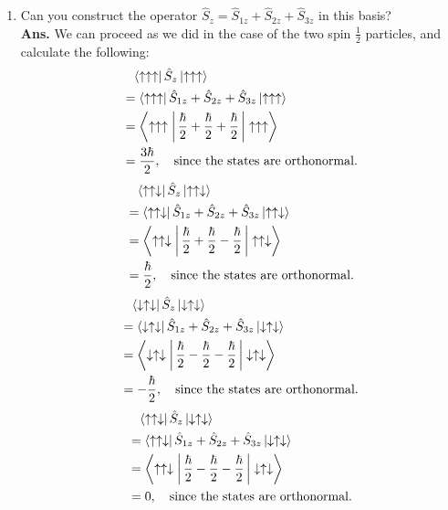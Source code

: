 \documentclass[12pt]{article}
\newcommand\half{\frac{1}{2}}
\newcommand\lr{\left \langle}
\newcommand\rr{\right \rangle}
\newcommand\ls{\left |}
\newcommand\rs{\right |}
\newcommand\hs{\hat{S}}
\newcommand\ua{\uparrow}
\newcommand\da{\downarrow}
\newcommand\hhalf{\frac{\hbar}{2}}
\begin{document}
\begin{enumerate}[1.]
\item Can you construct the operator $\hs_{z}=\hs_{1z}+\hs_{2z}+\hs_{3z}$ in this basis? \\ \newline
\textbf{Ans.} We can proceed as we did in the case of the two spin $\half$ particles, and calculate the following:
$$
\begin{aligned}
       & \hphantom{=} \lr \ua \ua \ua \rs \hs_{z} \ls \ua \ua \ua \rr \\
       & = \lr \ua \ua \ua \rs \hs_{1z}+\hs_{2z}+\hs_{3z} \ls \ua \ua \ua \rr \\
       & = \lr \ua \ua \ua \vphantom{\hhalf} \rs \hhalf + \hhalf + \hhalf \ls \vphantom{\hhalf} \ua \ua \ua \rr \\
       & = \frac{3\hbar}{2}, \quad \mbox{since the states are orthonormal.}
\end{aligned}
$$
$$
\begin{aligned}
       & \hphantom{=} \lr \ua \ua \da \rs \hs_{z} \ls \ua \ua \da \rr \\
       & = \lr \ua \ua \da \rs \hs_{1z}+\hs_{2z}+\hs_{3z} \ls \ua \ua \da \rr \\
       & = \lr \ua \ua \da \vphantom{\hhalf} \rs \hhalf + \hhalf - \hhalf \ls \vphantom{\hhalf} \ua \ua \da \rr \\
       & = \hhalf, \quad \mbox{since the states are orthonormal.}
\end{aligned}
$$
$$
\begin{aligned}
       & \hphantom{=} \lr \da \ua \da \rs \hs_{z} \ls \da \ua \da \rr \\
       & = \lr \da \ua \da \rs \hs_{1z}+\hs_{2z}+\hs_{3z} \ls \da \ua \da \rr \\
       & = \lr \da \ua \da \vphantom{\hhalf} \rs \hhalf - \hhalf - \hhalf \ls \vphantom{\hhalf} \da \ua \da \rr \\
       & = -\hhalf, \quad \mbox{since the states are orthonormal.}
\end{aligned}
$$
$$
\begin{aligned}
       & \hphantom{=} \lr \ua \ua \da \rs \hs_{z} \ls \da \ua \da \rr \\
       & = \lr \ua \ua \da \rs \hs_{1z}+\hs_{2z}+\hs_{3z} \ls \da \ua \da \rr \\
       & = \lr \ua \ua \da \vphantom{\hhalf} \rs \hhalf - \hhalf - \hhalf \ls \vphantom{\hhalf} \da \ua \da \rr \\
       & = 0, \quad \mbox{since the states are orthonormal.}
\end{aligned}
$$
\end{enumerate}
\end{document}
